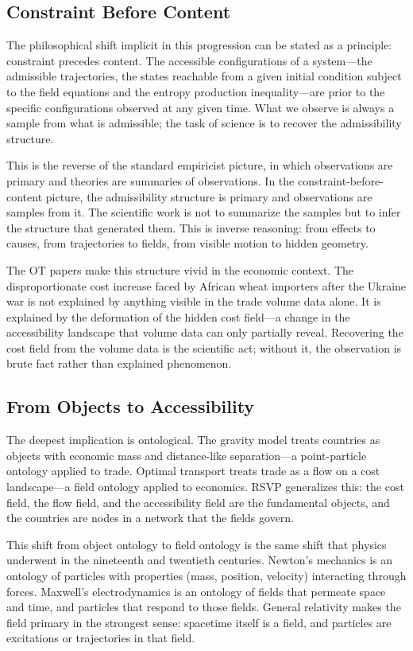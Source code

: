 \documentclass[12pt]{article}
\begin{document}
\subsection{Constraint Before Content}

The philosophical shift implicit in this progression can be stated as a principle: constraint precedes content. The accessible configurations of a system---the admissible trajectories, the states reachable from a given initial condition subject to the field equations and the entropy production inequality---are prior to the specific configurations observed at any given time. What we observe is always a sample from what is admissible; the task of science is to recover the admissibility structure.

This is the reverse of the standard empiricist picture, in which observations are primary and theories are summaries of observations. In the constraint-before-content picture, the admissibility structure is primary and observations are samples from it. The scientific work is not to summarize the samples but to infer the structure that generated them. This is inverse reasoning: from effects to causes, from trajectories to fields, from visible motion to hidden geometry.

The OT papers make this structure vivid in the economic context. The disproportionate cost increase faced by African wheat importers after the Ukraine war is not explained by anything visible in the trade volume data alone. It is explained by the deformation of the hidden cost field---a change in the accessibility landscape that volume data can only partially reveal. Recovering the cost field from the volume data is the scientific act; without it, the observation is brute fact rather than explained phenomenon.

\subsection{From Objects to Accessibility}

The deepest implication is ontological. The gravity model treats countries as objects with economic mass and distance-like separation---a point-particle ontology applied to trade. Optimal transport treats trade as a flow on a cost landscape---a field ontology applied to economics. RSVP generalizes this: the cost field, the flow field, and the accessibility field are the fundamental objects, and the countries are nodes in a network that the fields govern.

This shift from object ontology to field ontology is the same shift that physics underwent in the nineteenth and twentieth centuries. Newton's mechanics is an ontology of particles with properties (mass, position, velocity) interacting through forces. Maxwell's electrodynamics is an ontology of fields that permeate space and time, and particles that respond to those fields. General relativity makes the field primary in the strongest sense: spacetime itself is a field, and particles are excitations or trajectories in that field.
\end{document}
